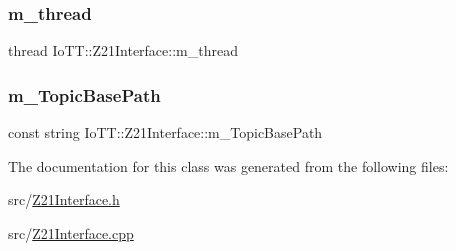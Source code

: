 \subsubsection{\texorpdfstring{m\+\_\+thread}{m\_thread}}
{\footnotesize\ttfamily thread Io\+T\+T\+::\+Z21\+Interface\+::m\+\_\+thread\hspace{0.3cm}{\ttfamily [private]}}

\mbox{\label{classIoTT_1_1Z21Interface_a88d755ba0c08a8c5dc79357e9093e980}} 
\subsubsection{\texorpdfstring{m\+\_\+\+Topic\+Base\+Path}{m\_TopicBasePath}}
{\footnotesize\ttfamily const string Io\+T\+T\+::\+Z21\+Interface\+::m\+\_\+\+Topic\+Base\+Path\hspace{0.3cm}{\ttfamily [private]}}



The documentation for this class was generated from the following files\+:\begin{DoxyCompactItemize}
\item 
src/\hyperlink{Z21Interface_8h}{Z21\+Interface.\+h}\item 
src/\hyperlink{Z21Interface_8cpp}{Z21\+Interface.\+cpp}\end{DoxyCompactItemize}
